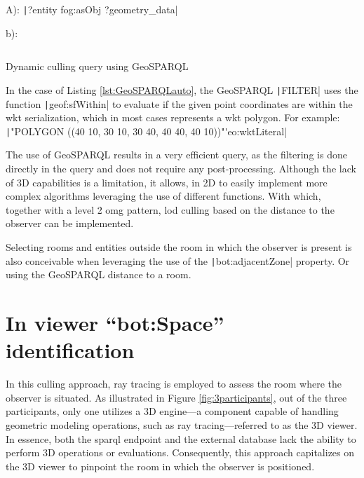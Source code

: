 A):
\texttt|?entity fog:asObj ?geometry_data|

b):
\begin{listing}[H]
    \inputminted{sparql}{dynamicQueries/inSitu/query.rq}
    \vspace{-0.7cm}
    \caption{Dynamic culling query using GeoSPARQL}
    \label{lst:GeoSPARQLauto}
\end{listing}

In the case of Listing \ref{lst:GeoSPARQLauto}, the GeoSPARQL \texttt|FILTER| uses the function \texttt|geof:sfWithin| to evaluate if the given point coordinates are within the \ac{wkt} serialization, which in most cases represents a \ac{wkt} polygon. For example:\\
\texttt|"POLYGON ((40 10, 30 10, 30 40, 40 40, 40 10))"^^geo:wktLiteral|

The use of GeoSPARQL results in a very efficient query, as the filtering is done directly in the query and does not require any post-processing. Although the lack of 3D capabilities is a limitation, it allows, in 2D to easily implement more complex algorithms leveraging the use of different functions. With which, together with a level 2 \ac{omg} pattern, \ac{lod} culling based on the distance to the observer can be implemented.

Selecting rooms and entities outside the room in which the observer is present is also conceivable when leveraging the use of the \texttt|bot:adjacentZone| property. Or using the GeoSPARQL distance to a room.

\section{In viewer \enquote{bot:Space} identification} \label{sec:inViewer}
In this culling approach, ray tracing is employed to assess the room where the observer is situated. As illustrated in Figure \ref{fig:3participants}, out of the three participants, only one utilizes a 3D engine—a component capable of handling geometric modeling operations, such as ray tracing—referred to as the 3D viewer. In essence, both the \ac{sparql} endpoint and the external database lack the ability to perform 3D operations or evaluations. Consequently, this approach capitalizes on the 3D viewer to pinpoint the room in which the observer is positioned.

